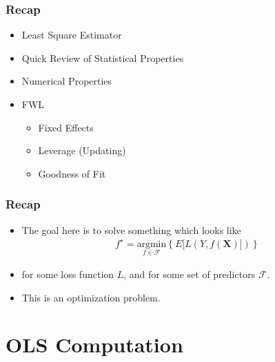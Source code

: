\documentclass[
  shownotes,
  xcolor={svgnames},
  hyperref={colorlinks,citecolor=DarkBlue,linkcolor=DarkRed,urlcolor=DarkBlue}
  , aspectratio=169]{beamer}
\begin{document}
\begin{frame}
\frametitle{Recap}


  \begin{itemize} 
    \item Least Square Estimator
    \medskip
    \item Quick Review of Statistical Properties
    \medskip
    \item Numerical Properties
    \medskip
    \item FWL
    \begin{itemize}
    \item Fixed Effects
    \item Leverage (Updating)
    \item Goodness of Fit
  \end{itemize}
  \end{itemize}
  
\end{frame}
\begin{frame}[fragile]
\frametitle{Recap}

\begin{itemize}

      \item The goal here is to solve something which looks like
    \begin{align}
    f^\star=\underset{f\in\mathcal{F}}{\text{argmin}}\left\lbrace E [L(Y,f(\mathbf{X})]) \right\rbrace
    \end{align}
\medskip
\item for some loss function $L$, and for some set of predictors $\mathcal{F}$. 
\medskip
\item This is an optimization problem. 

\end{itemize}


\end{frame}


\section{OLS Computation}
\end{document}
